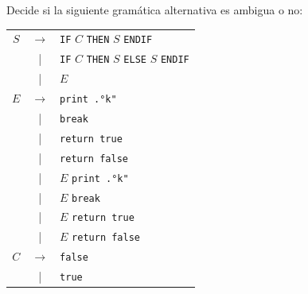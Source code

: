 \documentclass[12pt]{article}
\newcommand{\Aspace}{0.2cm}
\begin{document}
\newpage
Decide si la siguiente gramática alternativa es ambigua o no: \par
\begin{tabular}{ccl}
    $S$ & $\rightarrow$ & \texttt{IF} $C$ \texttt{THEN} $S$ \texttt{ENDIF} \\
    & | & \texttt{IF} $C$ \texttt{THEN} $S$ \texttt{ELSE} $S$ \texttt{ENDIF} \\
    & | & $E$ \\

    $E$ & $\rightarrow$ & \texttt{print .°k"} \\
    & | & \texttt{break} \\
    & | & \texttt{return true} \\
    & | & \texttt{return false} \\
    & | & $E$ \texttt{print .°k"} \\
    & | & $E$ \texttt{break} \\
    & | & $E$ \texttt{return true} \\
    & | & $E$ \texttt{return false} \\

    $C$ & $\rightarrow$ & \texttt{false} \\
    & | & \texttt{true} \\
\end{tabular} \\
    \vspace{\Aspace} \par
\end{document}
